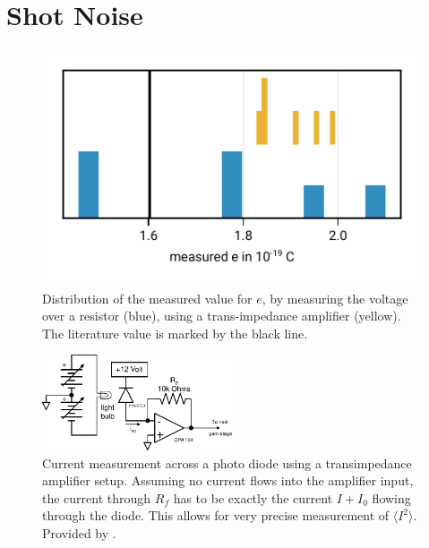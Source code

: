 \documentclass[
    parskip=half, 
    twoside=false,
    twocolumn=true,
    fontsize=11pt,
]{scrarticle}
\begin{document}
\section{Shot Noise}
\begin{figure}[h!]
    \centering
    \includegraphics{figures/03 shot noise.pdf}
    \caption{
        Distribution of the measured value for $e$, by measuring the voltage over a resistor (blue), using a trans-impedance amplifier (yellow).
        The literature value is marked by the black line.
    }
    \label{fig:shot noise}
\end{figure}
\begin{figure}[h!]
    \centering
    \includegraphics[width=0.5\textwidth]{figures/tamp_schematic.pdf}
    \caption{
        Current measurement across a photo diode using a transimpedance amplifier setup. Assuming no current flows into the amplifier input, the current through $R_f$ has to be exactly the current $I + I_0$ flowing through the diode. This allows for very precise measurement of $\langle I^2 \rangle$.
        Provided by \autocite{instructions}.
    }
    \label{fig:transimpedance schematic}
\end{figure}
\end{document}
